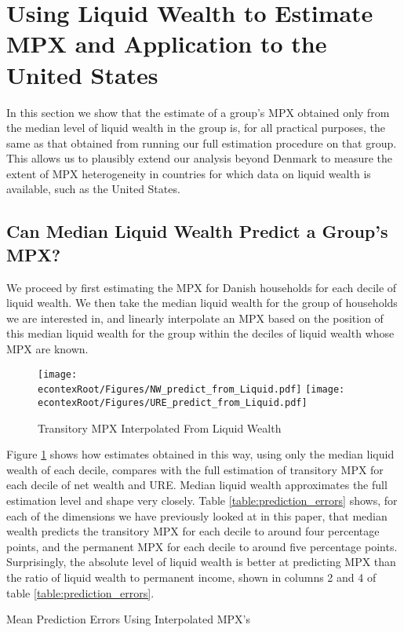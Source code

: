 \documentclass[titlepage]{\econtex}\newcommand{\texname}{ConsumptionHeterogeneity}
\begin{document}
	\section{Using Liquid Wealth to Estimate MPX and Application to the United States}
	\label{liquid_wealth_sufficient}
	In this section we show that the estimate of a group's MPX obtained only from the median level of liquid wealth in the group is, for all practical purposes, the same as that obtained from running our full estimation procedure on that group. This allows us to plausibly extend our analysis beyond Denmark to measure the extent of MPX heterogeneity in countries for which data on liquid wealth is available, such as the United States.
	
	\subsection{Can Median Liquid Wealth Predict a Group's MPX?}
	We proceed by first estimating the MPX for Danish households for each decile of liquid wealth. We then take the median liquid wealth for the group of households we are interested in, and linearly interpolate an MPX based on the position of this median liquid wealth for the group within the deciles of liquid wealth whose MPX are known. 
	
	\begin{figure}
		\centering
		\texttt{[image: \\econtexRoot/Figures/NW\_predict\_from\_Liquid.pdf]}
		\centering
		\texttt{[image: \\econtexRoot/Figures/URE\_predict\_from\_Liquid.pdf]}
		\caption{Transitory MPX Interpolated From Liquid Wealth}
		\label{fig:MPXPredict}
	\end{figure}
	
	Figure \ref{fig:MPXPredict} shows how estimates obtained in this way, using only the median liquid wealth of each decile, compares with the full estimation of transitory MPX for each decile of net wealth and URE. Median liquid wealth approximates the full estimation level and shape very closely. Table \ref{table:prediction_errors} shows, for each of the dimensions we have previously looked at in this paper, that median wealth predicts the transitory MPX for each decile to around four percentage points, and the permanent MPX for each decile to around five percentage points. Surprisingly, the absolute level of liquid wealth is better at predicting MPX than the ratio of liquid wealth to permanent income, shown in columns 2 and 4 of table \ref{table:prediction_errors}.
	
	\begin{center}
		\begin{table}
			\caption{Mean Prediction Errors Using Interpolated MPX's}
			\label{table:prediction_errors}
			\begin{center}
				
			\end{center}
		\end{table}
	\end{center}
	
\end{document}
